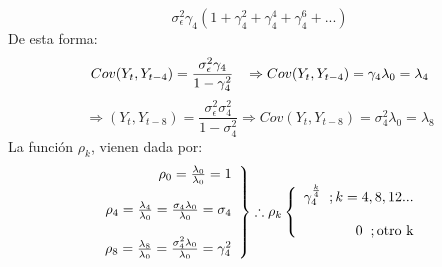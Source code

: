 \documentclass[12pt,letterpaper]{article}
\begin{document}
\begin{enumerate}
    \begin{equation*}
        \sigma_{\epsilon}^2\gamma_4(1+\gamma_4^2+\gamma_4^4+\gamma_4^6+...)
    \end{equation*}
    De esta forma:
    \begin{equation*}
        Cov(Y_t,Y_{t-4}) = \frac{\sigma_{\epsilon}^2\gamma_4}{1-\gamma_4^2} \hspace{3mm} \Rightarrow Cov(Y_t, Y_{t-4}) = \gamma_4 \lambda_0 = \lambda_4
    \end{equation*}
    \begin{equation*}
        \Rightarrow(Y_t,Y_{t-8}) = \frac{\sigma_{\epsilon}^2\sigma_4^2}{1-\sigma_4^2} \Rightarrow Cov(Y_t,Y_{t-8})=\sigma_4^2\lambda_0 = \lambda_8
    \end{equation*}
    La función $\rho_k$, vienen dada por:
    \begin{equation*}
    \left .
        \begin{array}{rcl}
            \rho_0 = \frac{\lambda_0}{\lambda_0} = 1\\
            \\
            \rho_4 = \frac{\lambda_4}{\lambda_0} = \frac{\sigma_4\lambda_0}{\lambda_0} = \sigma_4\\ \\
            \rho_8 = \frac{\lambda_8}{\lambda_0} = \frac{\sigma_4^2\lambda_0}{\lambda_0} = \gamma_4^2
        \end{array}
    \right  \} \therefore
    \rho_k
    \left \{
        \begin{array}{rcl}
            \gamma_4^{\frac{k}{4}}\hspace{2mm};k=4,8,12...\\ \\
            0\hspace{2mm}; \text{otro k}
        \end{array}
    \right.
    \end{equation*}




\end{enumerate}
\end{document}
